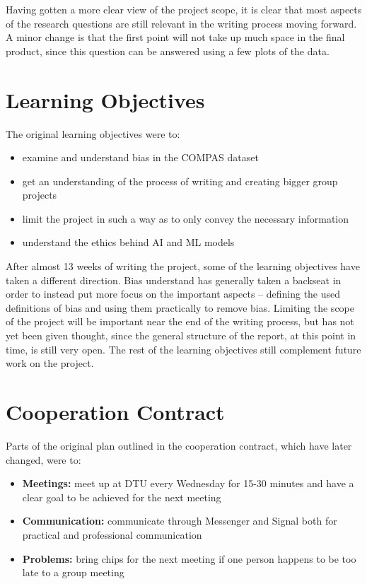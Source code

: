 \documentclass[11pt, fleqn]{article}
\begin{document}
	Having gotten a more clear view of the project scope, it is clear that most aspects of the research questions are still relevant in the writing process moving forward. A minor change is that the first point will not take up much space in the final product, since this question can be answered using a few plots of the data.
	
	\section*{Learning Objectives}
	The original learning objectives were to:
	\begin{itemize}
		\itemsep-0.1cm
		\item examine and understand bias in the COMPAS dataset
		\item get an understanding of the process of writing and creating bigger group projects
		\item limit the project in such a way as to only convey the necessary information
		\item understand the ethics behind AI and ML models
	\end{itemize}
	
	After almost 13 weeks of writing the project, some of the learning objectives have taken a different direction. Bias understand has generally taken a backseat in order to instead put more focus on the important aspects – defining the used definitions of bias and using them practically to remove bias. Limiting the scope of the project will be important near the end of the writing process, but has not yet been given thought, since the general structure of the report, at this point in time, is still very open. The rest of the learning objectives still complement future work on the project.
	
	\section*{Cooperation Contract}
	Parts of the original plan outlined in the cooperation contract, which have later changed, were to:
	\begin{itemize}
		\item \textbf{Meetings:} meet up at DTU every Wednesday for 15-30 minutes and have a clear goal to be achieved for the next meeting
		\item \textbf{Communication:} communicate through Messenger and Signal both for practical and professional communication
		\item \textbf{Problems:} bring chips for the next meeting if one person happens to be too late to a group meeting
	\end{itemize}
	
\end{document}
